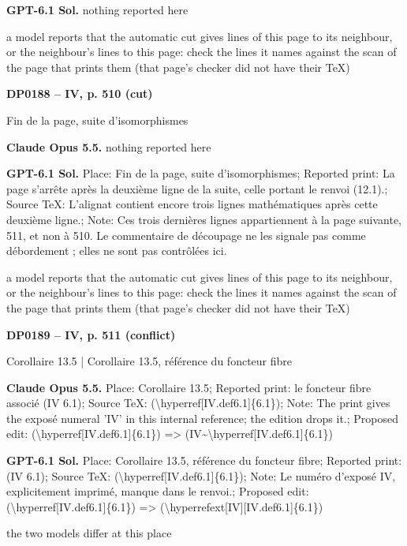 \textbf{GPT-6.1 Sol.} nothing reported here\par
a model reports that the automatic cut gives lines of this page to its neighbour, or the neighbour's lines to this page: check the lines it names against the scan of the page that prints them (that page's checker did not have their TeX)\par
\par\noindent\hypertarget{DP0188}{}\textbf{DP0188 -- IV, p. 510 (cut)}\par
Fin de la page, suite d'isomorphismes\par
\textbf{Claude Opus 5.5.} nothing reported here\par
\textbf{GPT-6.1 Sol.} Place: Fin de la page, suite d'isomorphismes; Reported print: La page s'arrête après la deuxième ligne de la suite, celle portant le renvoi (12.1).; Source TeX: L'alignat contient encore trois lignes mathématiques après cette deuxième ligne.; Note: Ces trois dernières lignes appartiennent à la page suivante, 511, et non à 510. Le commentaire de découpage ne les signale pas comme débordement ; elles ne sont pas contrôlées ici.\par
a model reports that the automatic cut gives lines of this page to its neighbour, or the neighbour's lines to this page: check the lines it names against the scan of the page that prints them (that page's checker did not have their TeX)\par
\par\noindent\hypertarget{DP0189}{}\textbf{DP0189 -- IV, p. 511 (conflict)}\par
Corollaire 13.5 | Corollaire 13.5, référence du foncteur fibre\par
\textbf{Claude Opus 5.5.} Place: Corollaire 13.5; Reported print: le foncteur fibre associé (IV 6.1); Source TeX: (\textbackslash{}hyperref[IV.def6.1]\{6.1\}); Note: The print gives the exposé numeral 'IV' in this internal reference; the edition drops it.; Proposed edit: (\textbackslash{}hyperref[IV.def6.1]\{6.1\}) =\allowbreak > (IV\textasciitilde{}\textbackslash{}hyperref[IV.def6.1]\{6.1\})\par
\textbf{GPT-6.1 Sol.} Place: Corollaire 13.5, référence du foncteur fibre; Reported print: (IV 6.1); Source TeX: (\textbackslash{}hyperref[IV.def6.1]\{6.1\}); Note: Le numéro d'exposé IV, explicitement imprimé, manque dans le renvoi.; Proposed edit: (\textbackslash{}hyperref[IV.def6.1]\{6.1\}) =\allowbreak > (\textbackslash{}hyperrefext[IV][IV.def6.1]\{6.1\})\par
the two models differ at this place\par
